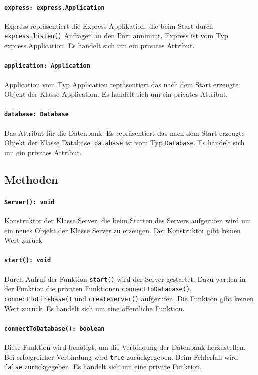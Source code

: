\documentclass{entwurfsheft}
\begin{document}
\begin{sloppypar}
\paragraph{\texttt{express: express.Application}}
Express repräsentiert die Express-Applikation, die beim Start durch \texttt{express.listen()} Anfragen an den Port annimmt.
Express ist vom Typ express.Application. Es handelt sich um ein privates Attribut.
\paragraph{\texttt{application: Application}}
Application vom Typ Application repräsentiert das nach dem Start erzeugte Objekt der Klasse Application. Es handelt sich um ein privates Attribut.
\paragraph{\texttt{database: Database}}
Das Attribut für die Datenbank. Es repräsentiert das nach dem Start erzeugte Objekt der Klasse Database. \texttt{database} ist vom Typ \texttt{Database}. Es handelt sich um ein privates Attribut.

\subsection*{Methoden}
\paragraph{\texttt{Server(): void}}
Konstruktor der Klasse Server, die beim Starten des Servers aufgerufen wird um ein neues Objekt der Klasse Server zu erzeugen. Der Konstruktor gibt keinen Wert zurück.
\paragraph{\texttt{start(): void}}
Durch Aufruf der Funktion \texttt{start()} wird der Server gestartet. Dazu werden in der Funktion die privaten Funktionen \texttt{connectToDatabase()}, \texttt{connectToFirebase()} und \texttt{createServer()} aufgerufen. Die Funktion gibt keinen Wert zurück.
Es handelt sich um eine öffentliche Funktion.
\paragraph{\texttt{connectToDatabase(): boolean}}
Diese Funktion wird benötigt, um die Verbindung der Datenbank herzustellen. Bei erfolgreicher Verbindung wird \texttt{true} zurückgegeben. Beim Fehlerfall wird \texttt{false} zurückgegeben. Es handelt sich um eine private Funktion.

\end{sloppypar}
\end{document}
